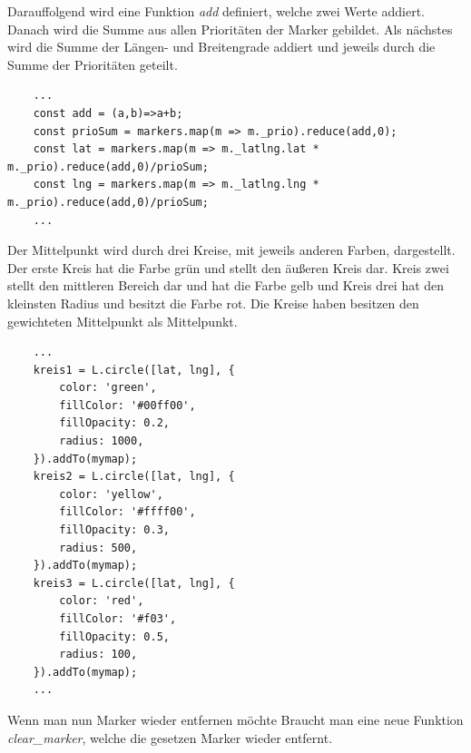 \documentclass[a4paper, 12pt]{scrreprt}
\begin{document}
Darauffolgend wird eine Funktion \textit{add} definiert, welche zwei Werte addiert. Danach wird die Summe aus allen Prioritäten der Marker gebildet. Als nächstes wird die Summe der Längen- und Breitengrade addiert und jeweils durch die Summe der Prioritäten geteilt.
\begin{lstlisting}
	...
	const add = (a,b)=>a+b;
	const prioSum = markers.map(m => m._prio).reduce(add,0);
	const lat = markers.map(m => m._latlng.lat * m._prio).reduce(add,0)/prioSum;
	const lng = markers.map(m => m._latlng.lng * m._prio).reduce(add,0)/prioSum;
	...
\end{lstlisting}
Der Mittelpunkt wird durch drei Kreise, mit jeweils anderen Farben, dargestellt.
Der erste Kreis hat die Farbe grün und stellt den äußeren Kreis dar.
Kreis zwei stellt den mittleren Bereich dar und hat die Farbe gelb und Kreis drei hat den kleinsten Radius und besitzt die Farbe rot.
Die Kreise haben besitzen den gewichteten Mittelpunkt als Mittelpunkt.
\begin{lstlisting}
	...
	kreis1 = L.circle([lat, lng], {
		color: 'green',
		fillColor: '#00ff00',
		fillOpacity: 0.2,
		radius: 1000,
	}).addTo(mymap);
	kreis2 = L.circle([lat, lng], {
		color: 'yellow',
		fillColor: '#ffff00',
		fillOpacity: 0.3,
		radius: 500,
	}).addTo(mymap);
	kreis3 = L.circle([lat, lng], {
		color: 'red',
		fillColor: '#f03',
		fillOpacity: 0.5,
		radius: 100,
	}).addTo(mymap);
	...
\end{lstlisting}
Wenn man nun Marker wieder entfernen möchte Braucht man eine neue Funktion \textit{clear\_marker}, welche die gesetzen Marker wieder entfernt.
\end{document}
